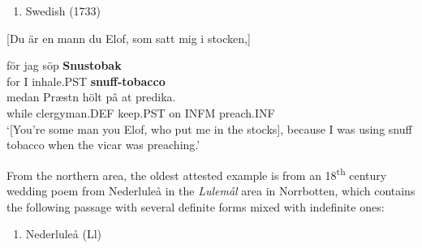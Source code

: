 \begin{enumerate} %
\item 
\label{bkm:Ref139171019}Swedish (1733)

\end{enumerate} %
[Du är en mann du Elof, som satt mig i stocken,]


\ea\label{}
\gll för  jag  söp  \textbf{Snustobak}\\


for  I  inhale.PST  \textbf{snuff-tobacco}\\ %


\ea\label{}
\gll medan  Præstn  hölt  pâ  at  predika.\\


while  clergyman.DEF  keep.PST  on   INFM  preach.INF\\ %


 ‘[You’re some man you Elof, who put me in the stocks], because I was using snuff tobacco when the vicar was preaching.’
\z


From the northern area, the oldest attested example is from an 18\textsuperscript{th} century wedding poem from Nederluleå in the \textit{Lulemål} area in Norrbotten, which contains the following passage with several definite forms mixed with indefinite ones:

\begin{enumerate} %
\item 
Nederluleå (Ll)

\end{enumerate} %
\ea\label{}
\\


